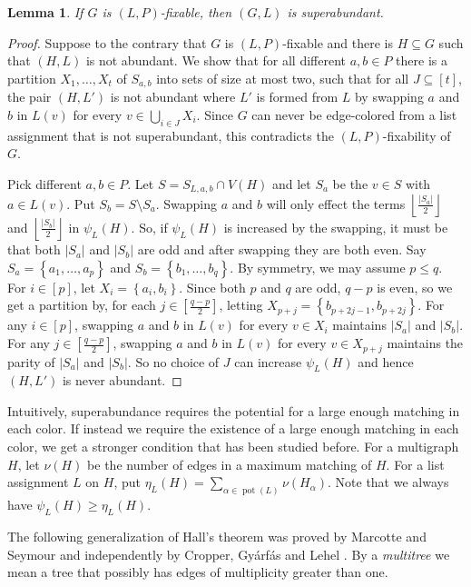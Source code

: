 \documentclass[12pt]{article}
\theoremstyle{plain}
\newtheorem{lem}[thm]{Lemma}
\theoremstyle{definition}
\theoremstyle{remark}
\newcommand{\set}[1]{\left\{ #1 \right\}}
\newcommand{\card}[1]{\left|#1\right|}
\newcommand{\floor}[1]{\left\lfloor#1\right\rfloor}
\newcommand{\irange}[1]{\left[#1\right]}
\newcommand{\pot}{\operatorname{pot}}
\begin{document}
\begin{lem}\label{SuperabundanceIsNecessary}
If $G$ is $(L, P)$-fixable, then $(G, L)$ is superabundant.
\end{lem}
\begin{proof}
Suppose to the contrary that $G$ is $(L, P)$-fixable and there is $H \subseteq G$ such that $(H, L)$ is not abundant. We show that for all different $a,b \in P$ there is a partition $X_1, \ldots, X_t$ of $S_{a,b}$ into sets of size at most two, such that for all $J \subseteq \irange{t}$, the pair $(H,L')$ is not abundant where $L'$ is formed from $L$ by swapping $a$ and $b$ in $L(v)$ for every $v \in \bigcup_{i \in J} X_i$.  Since $G$ can never be edge-colored from a list assignment that is not superabundant, this contradicts the $(L,P)$-fixability of $G$.

Pick different $a,b \in P$.  Let $S = S_{L,a,b} \cap V(H)$ and let $S_a$ be the $v \in S$ with $a \in L(v)$.  Put $S_b = S\setminus S_a$.  Swapping $a$ and $b$ will only effect the terms $\floor{\frac{\card{S_a}}{2}}$ and $\floor{\frac{\card{S_b}}{2}}$ in $\psi_L(H)$.  So, if $\psi_L(H)$ is increased by the swapping, it must be that both $|S_a|$ and $|S_b|$ are odd and after swapping they are both even.  Say $S_a = \set{a_1, \ldots,a_p}$ and $S_b = \set{b_1, \ldots,b_q}$.  By symmetry, we may assume $p \le q$.  For $i \in \irange{p}$, let $X_i = \set{a_i, b_i}$.  Since both $p$ and $q$ are odd, $q-p$ is even, so we get a partition by, for each $j \in \irange{\frac{q-p}{2}}$, letting $X_{p + j} = \set{b_{p + 2j - 1}, b_{p + 2j}}$.  For any $i \in \irange{p}$, swapping $a$ and $b$ in $L(v)$ for every $v \in X_i$ maintains $|S_a|$ and $|S_b|$.  For any $j \in \irange{\frac{q-p}{2}}$, swapping $a$ and $b$ in $L(v)$ for every $v \in X_{p+j}$ maintains the parity of $|S_a|$ and $|S_b|$.  So no choice of $J$ can increase $\psi_L(H)$ and hence $(H,L')$ is never abundant.
\end{proof}

Intuitively, superabundance requires the potential for a large enough matching in each color. If instead we require the existence of a large enough matching in each color, we get a stronger condition that has been studied before. For a multigraph $H$, let $\nu(H)$ be the number of edges in a maximum matching of $H$. 
For a list assignment $L$ on $H$, put $\eta_L(H) = \sum_{\alpha \in \pot(L)} \nu(H_\alpha)$.  Note that we always have $\psi_L(H) \ge \eta_L(H)$.

The following generalization of Hall's theorem was proved by Marcotte and Seymour \cite{marcotte1990extending} and independently by Cropper, Gy{\'a}rf{\'a}s and Lehel \cite{cropper2003edge}.  By a \emph{multitree} we mean a tree that possibly has edges of multiplicity greater than one.
\end{document}
